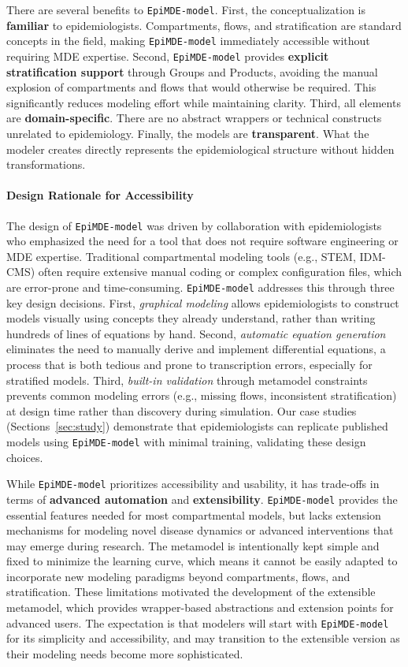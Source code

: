 There are several benefits to \texttt{EpiMDE-model}. First, the conceptualization is \textbf{familiar} to epidemiologists. Compartments, flows, and stratification are standard concepts in the field, making \texttt{EpiMDE-model} immediately accessible without requiring MDE expertise. Second, \texttt{EpiMDE-model} provides \textbf{explicit stratification support} through Groups and Products, avoiding the manual explosion of compartments and flows that would otherwise be required. This significantly reduces modeling effort while maintaining clarity. Third, all elements are \textbf{domain-specific}. There are no abstract wrappers or technical constructs unrelated to epidemiology. Finally, the models are \textbf{transparent}. What the modeler creates directly represents the epidemiological structure without hidden transformations.

\paragraph{Design Rationale for Accessibility}
The design of \texttt{EpiMDE-model} was driven by collaboration with epidemiologists who emphasized the need for a tool that does not require software engineering or MDE expertise. Traditional compartmental modeling tools (e.g., STEM, IDM-CMS) often require extensive manual coding or complex configuration files, which are error-prone and time-consuming. \texttt{EpiMDE-model} addresses this through three key design decisions. First, \textit{graphical modeling} allows epidemiologists to construct models visually using concepts they already understand, rather than writing hundreds of lines of equations by hand. Second, \textit{automatic equation generation} eliminates the need to manually derive and implement differential equations, a process that is both tedious and prone to transcription errors, especially for stratified models. Third, \textit{built-in validation} through metamodel constraints prevents common modeling errors (e.g., missing flows, inconsistent stratification) at design time rather than discovery during simulation. Our case studies (Sections~\ref{sec:study}) demonstrate that epidemiologists can replicate published models using \texttt{EpiMDE-model} with minimal training, validating these design choices.

While \texttt{EpiMDE-model} prioritizes accessibility and usability, it has trade-offs in terms of \textbf{advanced automation} and \textbf{extensibility}. \texttt{EpiMDE-model} provides the essential features needed for most compartmental models, but lacks extension mechanisms for modeling novel disease dynamics or advanced interventions that may emerge during research. The metamodel is intentionally kept simple and fixed to minimize the learning curve, which means it cannot be easily adapted to incorporate new modeling paradigms beyond compartments, flows, and stratification. These limitations motivated the development of the extensible metamodel, which provides wrapper-based abstractions and extension points for advanced users. The expectation is that modelers will start with \texttt{EpiMDE-model} for its simplicity and accessibility, and may transition to the extensible version as their modeling needs become more sophisticated.

